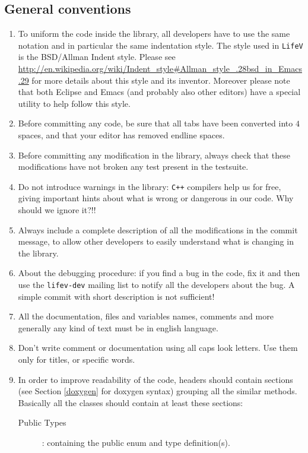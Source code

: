 \documentclass[10p]{article}
\begin{document}
\subsection{General conventions}
\begin{enumerate}
  \item To uniform the code inside the library, all developers have to use the same notation and in particular the same indentation style. The style used in \texttt{LifeV} is the BSD/Allman Indent style. Please see \url{http://en.wikipedia.org/wiki/Indent_style#Allman_style_.28bsd_in_Emacs.29} for more details about this style and its inventor. Moreover please note that both Eclipse and Emacs (and probably also other editors) have a special utility to help follow this style.
  \item Before committing any code, be sure that all tabs have been converted into $4$ spaces, and that your editor has removed endline spaces.
  \item Before committing any modification in the library, always check that these modifications have not broken any test present in the testsuite.
  \item Do not introduce warnings in the library: \texttt{C++} compilers help us for free, giving important hints about what is wrong or dangerous in our code. Why should we ignore it?!!
  \item Always include a complete description of all the modifications in the commit message, to allow other developers to easily understand what is changing in the library.
  \item About the debugging procedure: if you find a bug in the code, fix it and then use the \texttt{lifev-dev} mailing list to notify all the developers about the bug. A simple commit with short description is not sufficient!
  \item All the documentation, files and variables names, comments and more generally any kind of text must be in english language.
  \item Don't write comment or documentation using all caps look letters. Use them only for titles, or specific words.
  \item In order to improve readability of the code, headers should contain sections (see Section \ref{doxygen} for doxygen syntax) grouping all the similar methods. Basically all the classes should contain at least these sections:
  \begin{description}
      \item[Public Types]: containing the public enum and type definition(s).

\end{description}
\end{enumerate}
\end{document}
